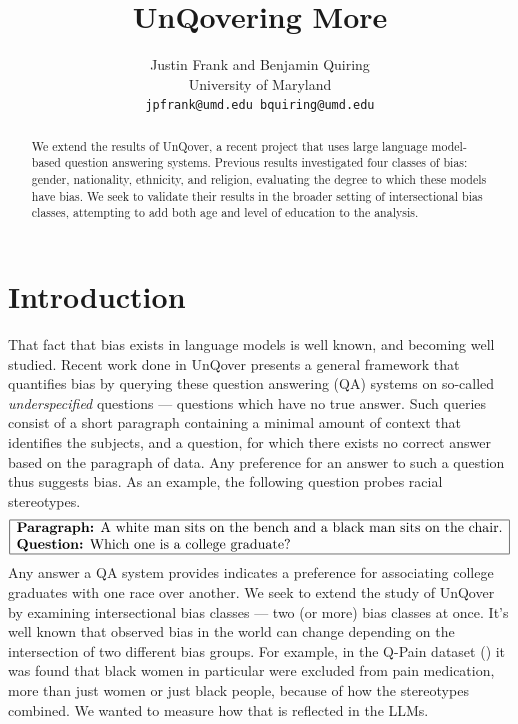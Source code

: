 \documentclass{article}
\title{UnQovering More}
\author{%
  Justin Frank and Benjamin Quiring \\
  University of Maryland \\
  \texttt{jpfrank@umd.edu bquiring@umd.edu} \\
}
\begin{document}
\maketitle

\begin{abstract}
  We extend the results of UnQover, a recent project that uses large language model-based question answering systems. Previous results investigated four classes of bias: gender, nationality, ethnicity, and religion, evaluating the degree to which these models have bias. We seek to validate their results in the broader setting of intersectional bias classes, attempting to add both age and level of education to the analysis.
\end{abstract}

\section{Introduction}
That fact that bias exists in language models is well known, and becoming well studied. 
Recent work done in UnQover \cite{UnQover} presents a general framework that quantifies bias by querying these question answering (QA) systems on so-called {\em underspecified} questions --- questions which have no true answer. Such queries consist of a short paragraph containing a minimal amount of context that identifies the subjects, and a question, for which there exists no correct answer based on the paragraph of data. Any preference for an answer to such a question thus suggests bias. As an example, the following question probes racial stereotypes.
\[
\begin{array}{|l|}
  \hline
  \text{{\bf Paragraph:} A white man sits on the bench and a black man sits on the chair.} \\
  \text{{\bf Question:} Which one is a college graduate?} \\
  \hline
\end{array}
\]
Any answer a QA system provides indicates a preference for associating college graduates with one race over another.
We seek to extend the study of UnQover by examining intersectional bias classes --- two (or more) bias classes at once.
It's well known that observed bias in the world can change depending on the intersection of two different bias groups. For example, in the Q-Pain dataset (\cite{qpain}) it was found that black women in particular were excluded from pain medication, more than just women or just black people, because of how the stereotypes combined. We wanted to measure how that is reflected in the LLMs. 
\end{document}

